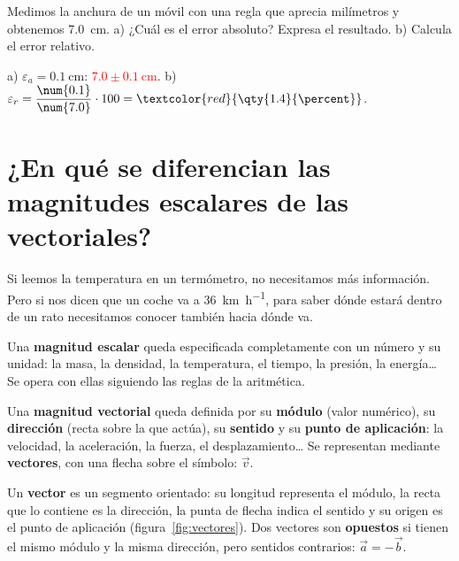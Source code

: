 \begin{exercise}
    Medimos la anchura de un móvil con una regla que aprecia milímetros y obtenemos \qty{7.0}{\cm}. a) ¿Cuál es el error absoluto? Expresa el resultado. b) Calcula el error relativo.
    \begin{solu}
        a) \(\varepsilon_a = \qty{0.1}{\cm}\): \textcolor{red}{\(\num{7.0} \pm \qty{0.1}{\cm}\)}. b) \(\varepsilon_r = \dfrac{\num{0.1}}{\num{7.0}} \cdot 100 = \textcolor{red}{\qty{1.4}{\percent}}\).
    \end{solu}
\end{exercise}

\section[Magnitudes escalares y vectoriales]{¿En qué se diferencian las magnitudes escalares de las vectoriales?}

Si leemos la temperatura en un termómetro, no necesitamos más información. Pero si nos dicen que un coche va a \qty{36}{\km\per\hour}, para saber dónde estará dentro de un rato necesitamos conocer también hacia dónde va.

\begin{definition}
    Una \textbf{magnitud escalar} queda especificada completamente con un número y su unidad: la masa, la densidad, la temperatura, el tiempo, la presión, la energía\ldots{} Se opera con ellas siguiendo las reglas de la aritmética.

    Una \textbf{magnitud vectorial} queda definida por su \textbf{módulo} (valor numérico), su \textbf{dirección} (recta sobre la que actúa), su \textbf{sentido} y su \textbf{punto de aplicación}: la velocidad, la aceleración, la fuerza, el desplazamiento\ldots{} Se representan mediante \textbf{vectores}, con una flecha sobre el símbolo: \(\vec{v}\).
\end{definition}

Un \textbf{vector} es un segmento orientado: su longitud representa el módulo, la recta que lo contiene es la dirección, la punta de flecha indica el sentido y su origen es el punto de aplicación (figura~\ref{fig:vectores}). Dos vectores son \textbf{opuestos} si tienen el mismo módulo y la misma dirección, pero sentidos contrarios: \(\vec{a} = -\vec{b}\).

